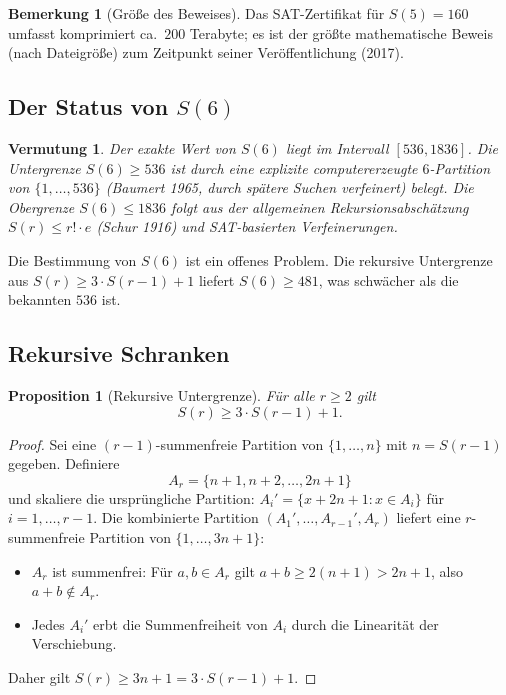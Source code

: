 \documentclass[12pt,a4paper]{amsart}
\newtheorem{proposition}[theorem]{Proposition}
\newtheorem{conjecture}[theorem]{Vermutung}
\theoremstyle{definition}
\newtheorem{remark}[theorem]{Bemerkung}
\begin{document}
\begin{remark}[Größe des Beweises]
Das SAT-Zertifikat für $S(5) = 160$ umfasst komprimiert ca.\ $200$ Terabyte;
es ist der größte mathematische Beweis (nach Dateigröße) zum Zeitpunkt seiner
Veröffentlichung (2017).
\end{remark}

\subsection{Der Status von \texorpdfstring{$S(6)$}{S(6)}}

\begin{conjecture}\label{verm:s6}
Der exakte Wert von $S(6)$ liegt im Intervall $[536, 1836]$. Die Untergrenze
$S(6) \geq 536$ ist durch eine explizite computererzeugte $6$-Partition von
$\{1, \ldots, 536\}$ (Baumert 1965, durch spätere Suchen verfeinert) belegt.
Die Obergrenze $S(6) \leq 1836$ folgt aus der allgemeinen Rekursionsabschätzung
$S(r) \leq r! \cdot e$ (Schur 1916) und SAT-basierten Verfeinerungen.
\end{conjecture}

Die Bestimmung von $S(6)$ ist ein offenes Problem. Die rekursive Untergrenze aus
$S(r) \geq 3 \cdot S(r-1) + 1$ liefert $S(6) \geq 481$, was schwächer als die
bekannten $536$ ist.

\subsection{Rekursive Schranken}

\begin{proposition}[Rekursive Untergrenze]
Für alle $r \geq 2$ gilt
\[
  S(r) \geq 3 \cdot S(r-1) + 1.
\]
\end{proposition}

\begin{proof}
Sei eine $(r-1)$-summenfreie Partition von $\{1,\ldots,n\}$ mit $n = S(r-1)$ gegeben.
Definiere
\[
  A_r = \{n+1, n+2, \ldots, 2n+1\}
\]
und skaliere die ursprüngliche Partition: $A_i' = \{x + 2n + 1 : x \in A_i\}$ für
$i = 1, \ldots, r-1$. Die kombinierte Partition $(A_1', \ldots, A_{r-1}', A_r)$
liefert eine $r$-summenfreie Partition von $\{1, \ldots, 3n+1\}$:
\begin{itemize}
\item $A_r$ ist summenfrei: Für $a, b \in A_r$ gilt $a + b \geq 2(n+1) > 2n+1$,
  also $a+b \notin A_r$.
\item Jedes $A_i'$ erbt die Summenfreiheit von $A_i$ durch die Linearität der Verschiebung.
\end{itemize}
Daher gilt $S(r) \geq 3n + 1 = 3 \cdot S(r-1) + 1$.
\end{proof}
\end{document}
